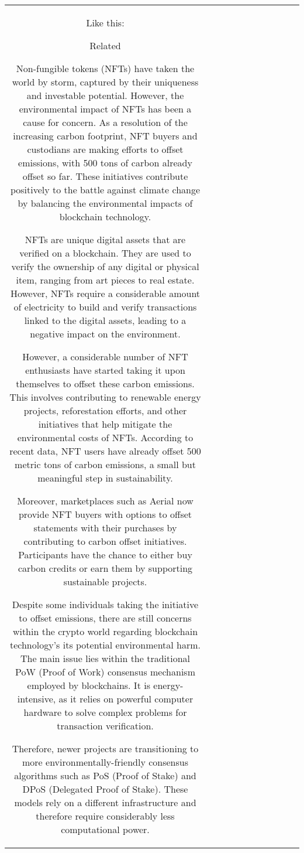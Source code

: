 \begin{table}[h!]
\begin{tabular}{|c|c|c|c|c|c|c|c|c|c|c|}
Like this:

Related



Non-fungible tokens (NFTs) have taken the world by storm, captured by their uniqueness and investable potential. However, the environmental impact of NFTs has been a cause for concern. As a resolution of the increasing carbon footprint, NFT buyers and custodians are making efforts to offset emissions, with 500 tons of carbon already offset so far. These initiatives contribute positively to the battle against climate change by balancing the environmental impacts of blockchain technology.

NFTs are unique digital assets that are verified on a blockchain. They are used to verify the ownership of any digital or physical item, ranging from art pieces to real estate. However, NFTs require a considerable amount of electricity to build and verify transactions linked to the digital assets, leading to a negative impact on the environment.

However, a considerable number of NFT enthusiasts have started taking it upon themselves to offset these carbon emissions. This involves contributing to renewable energy projects, reforestation efforts, and other initiatives that help mitigate the environmental costs of NFTs. According to recent data, NFT users have already offset 500 metric tons of carbon emissions, a small but meaningful step in sustainability.

Moreover, marketplaces such as Aerial now provide NFT buyers with options to offset statements with their purchases by contributing to carbon offset initiatives. Participants have the chance to either buy carbon credits or earn them by supporting sustainable projects.

Despite some individuals taking the initiative to offset emissions, there are still concerns within the crypto world regarding blockchain technology’s its potential environmental harm. The main issue lies within the traditional PoW (Proof of Work) consensus mechanism employed by blockchains. It is energy-intensive, as it relies on powerful computer hardware to solve complex problems for transaction verification.

Therefore, newer projects are transitioning to more environmentally-friendly consensus algorithms such as PoS (Proof of Stake) and DPoS (Delegated Proof of Stake). These models rely on a different infrastructure and therefore require considerably less computational power.


\end{tabular}
\end{table}
